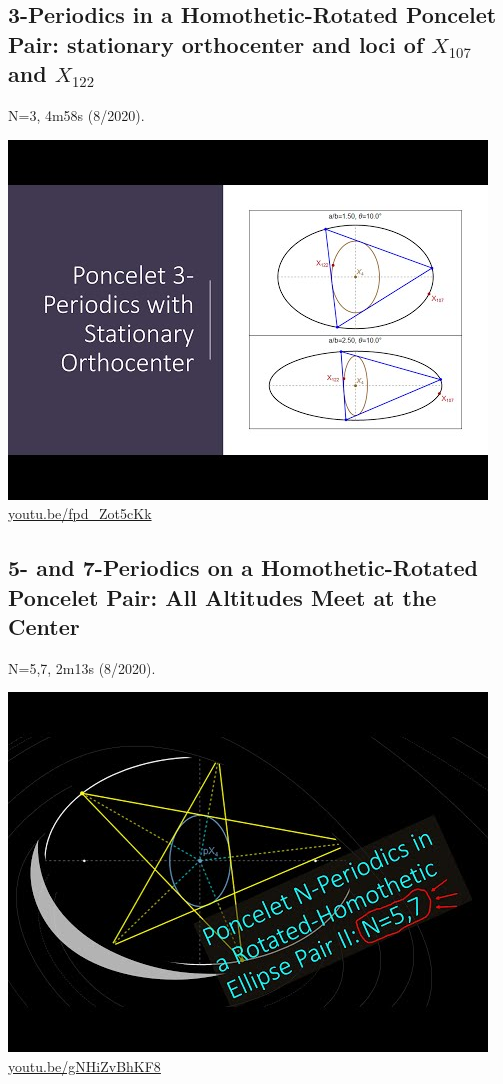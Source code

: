 \documentclass[12pt]{amsart}
\begin{document}
\subsection{3-Periodics in a Homothetic-Rotated Poncelet Pair: stationary orthocenter and loci of $X_{107}$ and $X_{122}$}
\label{vid:fpd_Zot5cKk}
\noindent N=3, 4m58s (8/2020). 
\begin{center}\includegraphics[width=.5\textwidth]{pics/fpd_Zot5cKk.jpg} \\ 
\href{https://youtu.be/fpd_Zot5cKk}{\url{youtu.be/fpd\_Zot5cKk}}\end{center}
% 

\subsection{5- and 7-Periodics on a Homothetic-Rotated Poncelet Pair: All Altitudes Meet at the Center}
\label{vid:gNHiZvBhKF8}
\noindent N=5,7, 2m13s (8/2020). 
\begin{center}\includegraphics[width=.5\textwidth]{pics/gNHiZvBhKF8.jpg} \\ 
\href{https://youtu.be/gNHiZvBhKF8}{\url{youtu.be/gNHiZvBhKF8}}\end{center}
% 
\end{document}
